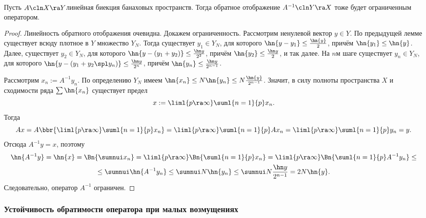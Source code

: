 \documentclass[a4paper]{article}
\begin{document}
\begin{theorem}
Пусть $A\cln X \ra Y$\т линейная биекция банаховых пространств.
Тогда обратное отображение $A^{-1}\cln Y \ra X$ тоже будет ограниченным оператором.
\end{theorem}
\begin{proof}
Линейность обратного отображения очевидна. Докажем ограниченность.
Рассмотрим ненулевой вектор $y \in Y$. По предыдущей лемме существует всюду плотное в $Y$ множество $Y_N$.
Тогда существует $y_1 \in Y_N$, для которого $\hn{y- y_1} \le \frac{\hn{y}}{2}$, причём $\hn{y_1} \le \hn{y}$.
Далее, существует $y_2 \in Y_N$, для которого $\hn{y-(y_1+y_2)}\le\frac{\hn y}{2^2}$, причём
$\hn{y_2} \le\frac{\hn y}{2}$, и так далее.
На $n$\д м шаге существует $y_n \in Y_N$, для которого
$\hn{y-(y_1+y_2\spl y_n)}\le\frac{\hn y}{2^n}$, причём
$\hn{y_n} \le\frac{\hn y}{2^{n-1}}$.

Рассмотрим $x_n := A^{-1}y_n$. По определению $Y_N$ имеем
$\hn{x_n} \le N\hn{y_n} \le N\frac{\hn{y}}{2^{n-1}}$.
Значит, в силу полноты пространства $X$ и сходимости ряда $\sum \hn{x_n}$ существует предел
$$x := \liml{p\ra\infty}\suml{n=1}{p} x_n.$$
Тогда
$$
  Ax = A\bbr{\liml{p\ra\infty}\suml{n=1}{p}x_n} = \liml{p\ra\infty} \suml{n=1}{p}Ax_n=
  \liml{p\ra\infty}\suml{n=1}{p}y_n=y.
$$
Отсюда $A^{-1}y=x$, поэтому
\begin{multline*}
  \hn{A^{-1}y}=\hn{x} = \Bn{\sumnui x_n} = \liml{p\ra\infty}\Bn{\suml{n=1}{p}x_n} =
  \liml{p\ra\infty}\Bn{\suml{n=1}{p}A^{-1}y_n} \le \\ \le\sumnui\hn{A^{-1}y_n} \le
  \sumnui N\hn{y_n} \le \sumnui N \frac{\hn y}{2^{n-1}} = 2N\hn{y}.
\end{multline*}
Следовательно, оператор $A^{-1}$ ограничен.
\end{proof}

\subsubsection{Устойчивость обратимости оператора при малых возмущениях}
\end{document}
